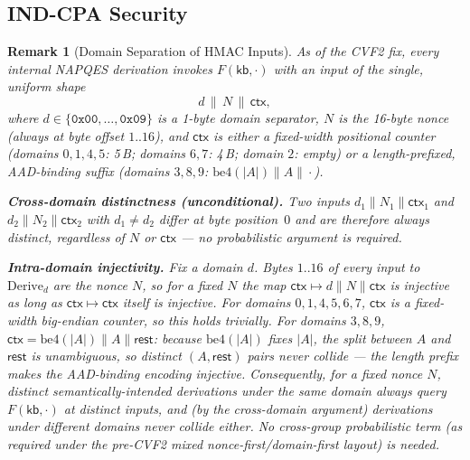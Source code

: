 \documentclass[11pt,a4paper]{article}
\newtheorem{remark}[theorem]{Remark}
\begin{document}
\subsection{IND-CPA Security}

\begin{remark}[Domain Separation of HMAC Inputs]\label{rem:domsep}
As of the CVF2 fix, every internal NAPQES derivation invokes
$F(\mathsf{kb},\cdot)$ with an input of the single, uniform shape
\[
  d \,\|\, N \,\|\, \mathsf{ctx},
\]
where $d \in \{\texttt{0x00},\ldots,\texttt{0x09}\}$ is a 1-byte domain
separator, $N$ is the 16-byte nonce (always at byte offset $1..16$), and
$\mathsf{ctx}$ is either a fixed-width positional counter (domains
$0,1,4,5$: 5\,B; domains $6,7$: 4\,B; domain $2$: empty) or a
length-prefixed, AAD-binding suffix (domains $3,8,9$:
$\mathrm{be4}(|A|) \| A \| \cdot$).

\noindent
\textbf{Cross-domain distinctness (unconditional).}
Two inputs $d_1\|N_1\|\mathsf{ctx}_1$ and $d_2\|N_2\|\mathsf{ctx}_2$ with
$d_1 \neq d_2$ differ at byte position~$0$ and are therefore always
distinct, regardless of $N$ or $\mathsf{ctx}$ — no probabilistic argument
is required.

\noindent
\textbf{Intra-domain injectivity.}
Fix a domain $d$. Bytes $1..16$ of every input to $\mathrm{Derive}_d$ are
the nonce $N$, so for a fixed $N$ the map $\mathsf{ctx} \mapsto d\|N\|\mathsf{ctx}$
is injective as long as $\mathsf{ctx} \mapsto \mathsf{ctx}$ itself is
injective. For domains $0,1,4,5,6,7$, $\mathsf{ctx}$ is a fixed-width
big-endian counter, so this holds trivially. For domains $3,8,9$,
$\mathsf{ctx} = \mathrm{be4}(|A|) \| A \| \mathsf{rest}$: because $\mathrm{be4}(|A|)$
fixes $|A|$, the split between $A$ and $\mathsf{rest}$ is unambiguous, so
distinct $(A, \mathsf{rest})$ pairs never collide — the length prefix makes
the AAD-binding encoding injective. Consequently, for a fixed nonce $N$,
distinct semantically-intended derivations under the same domain always
query $F(\mathsf{kb},\cdot)$ at distinct inputs, and (by the cross-domain
argument) derivations under different domains never collide either. No
cross-group probabilistic term (as required under the pre-CVF2 mixed
nonce-first/domain-first layout) is needed.


\end{remark}
\end{document}
